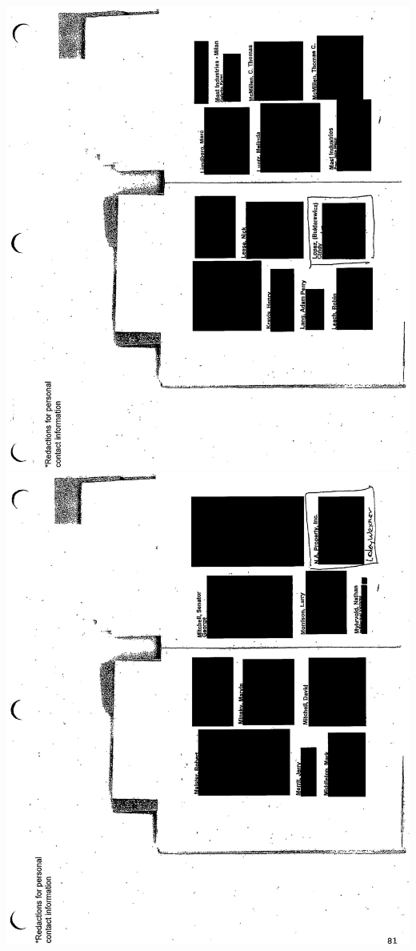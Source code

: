 \documentclass[10pt]{article}
\begin{document}
\includegraphics[max width=\textwidth, center]{2025_02_27_dd68c3d38de88f0516d9g-197}\\
\includegraphics[max width=\textwidth, center]{2025_02_27_dd68c3d38de88f0516d9g-198}\\
\end{document}
